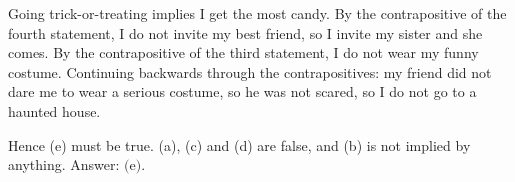 Going trick-or-treating implies I get the most candy. By the contrapositive of the fourth statement, I do not invite my best friend, so I invite my sister and she comes. By the contrapositive of the third statement, I do not wear my funny costume. Continuing backwards through the contrapositives: my friend did not dare me to wear a serious costume, so he was not scared, so I do not go to a haunted house.

Hence (e) must be true. (a), (c) and (d) are false, and (b) is not implied by anything. Answer: $\boxed{\text{(e)}}$.
